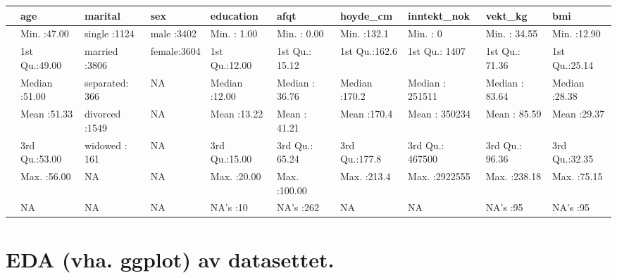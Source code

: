 \documentclass[
  12pt,
  norsk,
]{article}
\begin{document}
\begin{longtable}[]{@{}
  >{\raggedright\arraybackslash}p{}
  >{\raggedright\arraybackslash}p{}
  >{\raggedright\arraybackslash}p{}
  >{\raggedright\arraybackslash}p{}
  >{\raggedright\arraybackslash}p{}
  >{\raggedright\arraybackslash}p{}
  >{\raggedright\arraybackslash}p{}
  >{\raggedright\arraybackslash}p{}
  >{\raggedright\arraybackslash}p{}
  >{\raggedright\arraybackslash}p{}@{}}
\toprule
& age & marital & sex & education & afqt & hoyde\_cm & inntekt\_nok &
vekt\_kg & bmi \\
\midrule
\endhead
& Min. :47.00 & single :1124 & male :3402 & Min. : 1.00 & Min. : 0.00 &
Min. :132.1 & Min. : 0 & Min. : 34.55 & Min. :12.90 \\
& 1st Qu.:49.00 & married :3806 & female:3604 & 1st Qu.:12.00 & 1st Qu.:
15.12 & 1st Qu.:162.6 & 1st Qu.: 1407 & 1st Qu.: 71.36 & 1st
Qu.:25.14 \\
& Median :51.00 & separated: 366 & NA & Median :12.00 & Median : 36.76 &
Median :170.2 & Median : 251511 & Median : 83.64 & Median :28.38 \\
& Mean :51.33 & divorced :1549 & NA & Mean :13.22 & Mean : 41.21 & Mean
:170.4 & Mean : 350234 & Mean : 85.59 & Mean :29.37 \\
& 3rd Qu.:53.00 & widowed : 161 & NA & 3rd Qu.:15.00 & 3rd Qu.: 65.24 &
3rd Qu.:177.8 & 3rd Qu.: 467500 & 3rd Qu.: 96.36 & 3rd Qu.:32.35 \\
& Max. :56.00 & NA & NA & Max. :20.00 & Max. :100.00 & Max. :213.4 &
Max. :2922555 & Max. :238.18 & Max. :75.15 \\
& NA & NA & NA & NA's :10 & NA's :262 & NA & NA & NA's :95 & NA's :95 \\
\bottomrule
\end{longtable}

\hypertarget{eda-vha.-ggplot-av-datasettet.}{%
\section{EDA (vha. ggplot) av
datasettet.}\label{eda-vha.-ggplot-av-datasettet.}}
\end{document}
